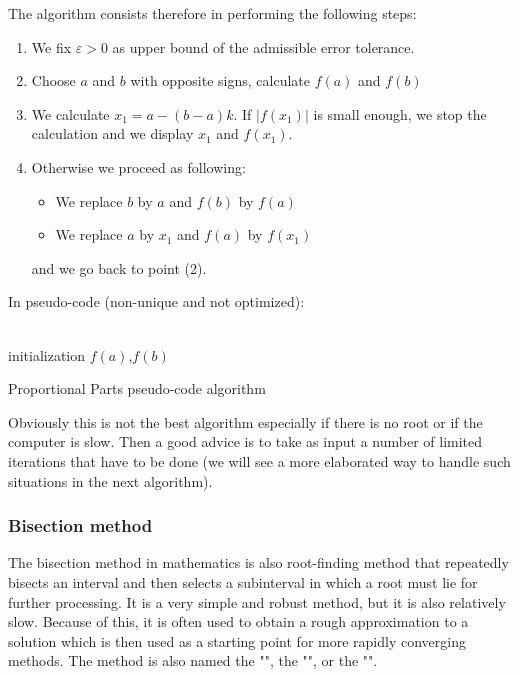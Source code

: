 	The algorithm consists therefore in performing the following steps:
	\begin{enumerate}
		\item We fix $\varepsilon>0$ as upper bound of the admissible error tolerance.		
		
		\item Choose $a$ and $b$ with opposite signs, calculate $f(a)$ and $f(b)$
		
		\item We calculate $x_1=a-(b-a)k$. If $|f(x_1)|$ is small enough, we stop the calculation and we display $x_1$ and $f(x_1)$.

		\item Otherwise we proceed as following:
		\begin{itemize}
			\item We replace $b$ by $a$ and $f(b)$ by $f(a)$
			\item We replace $a$ by $x_1$ and $f(a)$ by $f(x_1)$
		\end{itemize} 
		and we go back to point (2).
	\end{enumerate}
	In pseudo-code (non-unique and not optimized):\\\\
	\begin{algorithm}[H]
	 initialization\;
	$f(a)$,$f(b)$\;
	 \caption{Proportional Parts pseudo-code algorithm}
	\end{algorithm}
	Obviously this is not the best algorithm especially if there is no root or if the computer is slow. Then a good advice is to take as input a number of limited iterations that have to be done (we will see a more elaborated way to handle such situations in the next algorithm).
	
	\subsubsection{Bisection method}\label{bisection method}
	The bisection method in mathematics is also root-finding method that repeatedly bisects an interval and then selects a subinterval in which a root must lie for further processing. It is a very simple and robust method, but it is also relatively slow. Because of this, it is often used to obtain a rough approximation to a solution which is then used as a starting point for more rapidly converging methods. The method is also named the "", the "", or the "".
	

